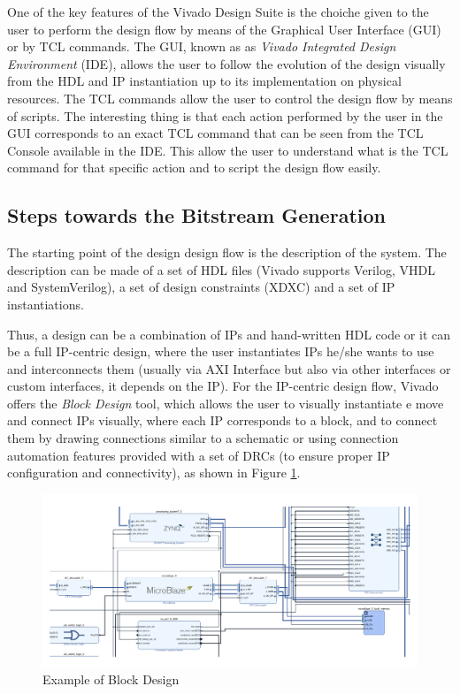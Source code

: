 One of the key features of the Vivado Design Suite is the choiche given to the user to perform the design flow by means of the Graphical User Interface (GUI) or by TCL commands. The GUI, known as as \textit{Vivado Integrated Design Environment} (IDE), allows the user to follow the evolution of the design visually from the HDL and IP instantiation up to its implementation on physical resources. The TCL commands allow the user to control the design flow by means of scripts. The interesting thing is that each action performed by the user in the GUI corresponds to an exact TCL command that can be seen from the TCL Console available in the IDE. This allow the user to understand what is the TCL command for that specific action and to script the design flow easily. 

\subsection{Steps towards the Bitstream Generation}

The starting point of the design design flow is the description of the system. The description can be made of a set of HDL files (Vivado supports Verilog, VHDL and SystemVerilog), a set of design constraints (XDXC) and a set of IP instantiations. \bigskip 

Thus, a design can be a combination of IPs and hand-written HDL code or it can be a full IP-centric design, where the user instantiates IPs he/she wants to use and interconnects them (usually via AXI Interface but also via other interfaces or custom interfaces, it depends on the IP). For the IP-centric design flow, Vivado offers the \textit{Block Design} tool, which allows the user to visually instantiate e move and connect IPs visually, where each IP corresponds to a block, and to connect them by drawing connections similar to a schematic or using connection automation features provided with a set of DRCs (to ensure proper IP configuration and connectivity), as shown in Figure \ref{fig:block_design_example}. \bigskip

\begin{figure}[H]
\centering
\includegraphics[width=0.75\linewidth]{images/chapter3/design_example-cropped.pdf}
\caption{Example of Block Design}
\label{fig:block_design_example}
\end{figure}

